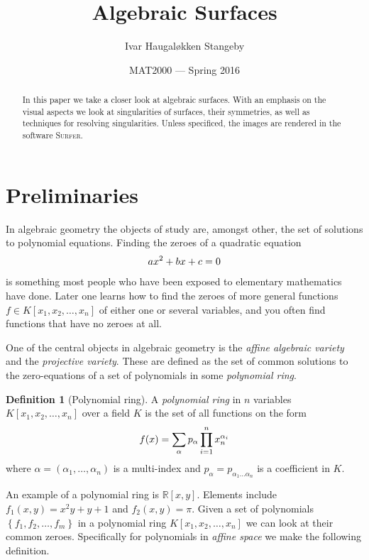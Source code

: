 \documentclass{article}
\title{Algebraic Surfaces}
\author{Ivar Haugal{\o}kken Stangeby}
\date{MAT2000 --- Spring 2016}
\theoremstyle{definition}
\newtheorem{definition}{Definition}
\newcommand{\R}{\mathbb{R}}
\begin{document}
\maketitle    

\begin{abstract}
    In this paper we take a closer look at algebraic surfaces. With an emphasis
    on the visual aspects we look at singularities of surfaces, their
    symmetries, as well as techniques for resolving singularities. Unless
    specificed, the images are rendered in the software \textsc{Surfer}.
\end{abstract}

\tableofcontents

\section{Preliminaries}
\label{sec:preliminaries}

In algebraic geometry the objects of study are, amongst other, the set of
solutions to polynomial equations. Finding the zeroes of a quadratic equation
\begin{equation}
    \notag
    ax^2 + bx + c = 0
\end{equation} 
is something most people who have been exposed to elementary mathematics have
done. Later one learns how to find the zeroes of more general functions $f \in
K[x_1, x_2, \ldots, x_n]$ of either one or several variables, and you often
find functions that have no zeroes at all. 

One of the central objects in algebraic geometry is the \emph{affine algebraic
variety} and the \emph{projective variety}. These are defined as the set of
common solutions to the zero-equations of a set of polynomials in some
\emph{polynomial ring}.

\begin{definition}[Polynomial ring]
    A \emph{polynomial ring} in $n$ variables $K[x_1, x_2, \ldots, x_{n}]$ over a
    field $K$ is the set of all functions on the form
    \begin{equation}
        \notag
        f(x) = \sum_{\alpha} p_\alpha \prod_{i=1}^{n} x_n^{\alpha_i}
    \end{equation}
    where $\alpha = (\alpha_1, \ldots, \alpha_n)$ is a multi-index and
    $p_\alpha = p_{\alpha_1\ldots\alpha_n}$ is a coefficient in $K$.
\end{definition}
An example of a polynomial ring is $\R[x, y]$. Elements include $f_1(x, y) =
x^2y + y + 1$ and $f_2(x, y) = \pi$. Given a set of polynomials $\left\{f_1, f_2, \ldots,
f_m\right\}$ in a polynomial ring $K \left[ x_1, x_2, \ldots, x_n \right]$ we can look at
their common zeroes. Specifically for polynomials in \emph{affine space} we
make the following definition.
\end{document}
